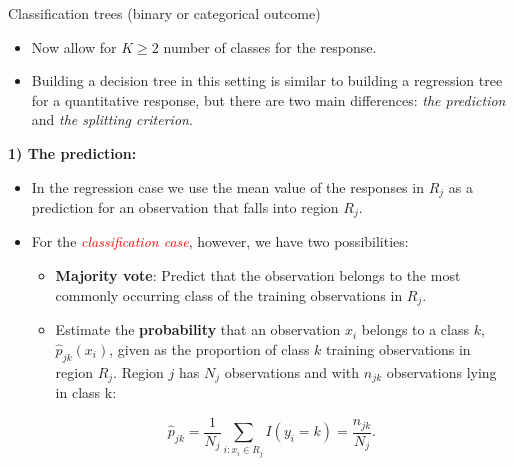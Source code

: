 \documentclass[
  10pt,
  ignorenonframetext,
]{beamer}
\providecommand{\tightlist}{%
  \setlength{\itemsep}{0pt}\setlength{\parskip}{0pt}}
\begin{document}
\begin{frame}{Classification trees (binary or categorical outcome)}
\protect\hypertarget{classification-trees-binary-or-categorical-outcome}{}
\vspace{2mm}

\begin{itemize}
\tightlist
\item
  Now allow for \(K\geq 2\) number of classes for the response.
\end{itemize}

\vspace{1mm}

\begin{itemize}
\tightlist
\item
  Building a decision tree in this setting is similar to building a
  regression tree for a quantitative response, but there are two main
  differences: \emph{the prediction} and \emph{the splitting criterion}.
\end{itemize}
\end{frame}

\begin{frame}
\textbf{1) The prediction:}

\begin{itemize}
\item
  In the regression case we use the mean value of the responses in
  \(R_j\) as a prediction for an observation that falls into region
  \(R_j\). \vspace{2mm}
\item
  For the \emph{\textcolor{red}{classification case}}, however, we have
  two possibilities:

  \begin{itemize}
  \item
    \textbf{Majority vote}: Predict that the observation belongs to the
    most commonly occurring class of the training observations in
    \(R_j\).\\
    \vspace{2mm}
  \item
    Estimate the \textbf{probability} that an observation \(x_i\)
    belongs to a class \(k\), \(\hat{p}_{jk}(x_i)\), given as the
    proportion of class \(k\) training observations in region \(R_j\).
    Region \(j\) has \(N_j\) observations and with \(n_{jk}\)
    observations lying in class k:
  \end{itemize}

  \[\hat{p}_{jk} = \frac{1}{N_j} \sum_{i:x_i \in R_j} I(y_i = k)=\frac{n_{jk}}{N_j}.\]
\end{itemize}
\end{frame}
\end{document}
